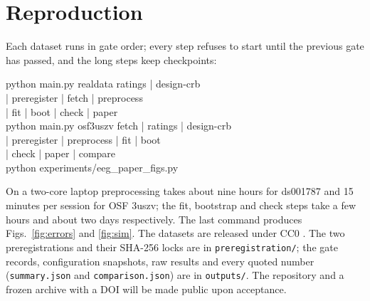 \section{Reproduction}
\label{app:repro}
Each dataset runs in gate order; every step refuses to start until the previous gate has passed, and the long steps keep checkpoints:
\begin{flushleft}\footnotesize\ttfamily
python main.py realdata ratings | design-crb\\
\hspace*{1.5em}| preregister | fetch | preprocess\\
\hspace*{1.5em}| fit | boot | check | paper\\
python main.py osf3uszv fetch | ratings | design-crb\\
\hspace*{1.5em}| preregister | preprocess | fit | boot\\
\hspace*{1.5em}| check | paper | compare\\
python experiments/eeg\_paper\_figs.py
\end{flushleft}
On a two-core laptop preprocessing takes about nine hours for ds001787 and 15 minutes per session for OSF 3uszv; the fit, bootstrap and check steps take a few hours and about two days respectively. The last command produces Figs.~\ref{fig:errors} and \ref{fig:sim}. The datasets are released under CC0 \cite{Delorme2024ds,RodriguezLarios2021}. The two preregistrations and their SHA-256 locks are in \texttt{preregistration/}; the gate records, configuration snapshots, raw results and every quoted number (\texttt{summary.json} and \texttt{comparison.json}) are in \texttt{outputs/}. The repository and a frozen archive with a DOI will be made public upon acceptance.
